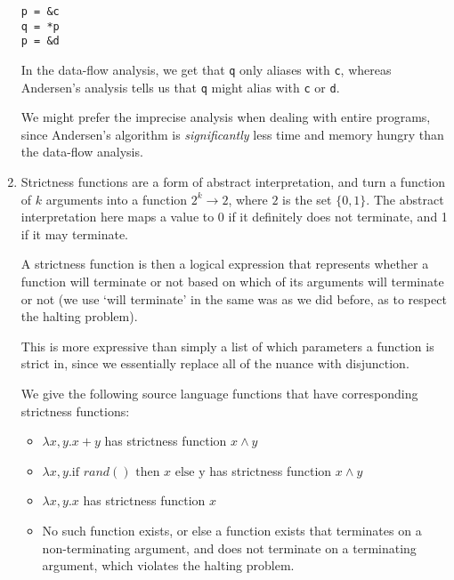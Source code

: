 \begin{enumerate}[label=(\alph*)]
\begin{verbatim}
p = &c
q = *p
p = &d
\end{verbatim}

In the data-flow analysis, we get that \texttt{q} only aliases with \texttt{c}, whereas Andersen's analysis tells us that \texttt{q} might alias with \texttt{c} or \texttt{d}.

We might prefer the imprecise analysis when dealing with entire programs, since Andersen's algorithm is \textit{significantly} less time and memory hungry than the data-flow analysis.

\item
    Strictness functions are a form of abstract interpretation, and turn a function of $k$ arguments into a function $2^k \rightarrow 2$, where $2$ is the set $\{0,1\}$. The abstract interpretation here maps a value to 0 if it definitely does not terminate, and 1 if it may terminate.

    A strictness function is then a logical expression that represents whether a function will terminate or not based on which of its arguments will terminate or not (we use `will terminate' in the same was as we did before, as to respect the halting problem).

    This is more expressive than simply a list of which parameters a function is strict in, since we essentially replace all of the nuance with disjunction.

    We give the following source language functions that have corresponding strictness functions:

    \begin{itemize}
        \item
            $\lambda x,y. x + y$ has strictness function $x \wedge y$

        \item
            $\lambda x,y. \text{if }rand()\text{ then }x\text{ else y}$ has strictness function $x \wedge y$

        \item
            $\lambda x,y. x$ has strictness function $x$

        \item
            No such function exists, or else a function exists that terminates on a non-terminating argument, and does not terminate on a terminating argument, which violates the halting problem.
    \end{itemize}


        
    \end{enumerate}


